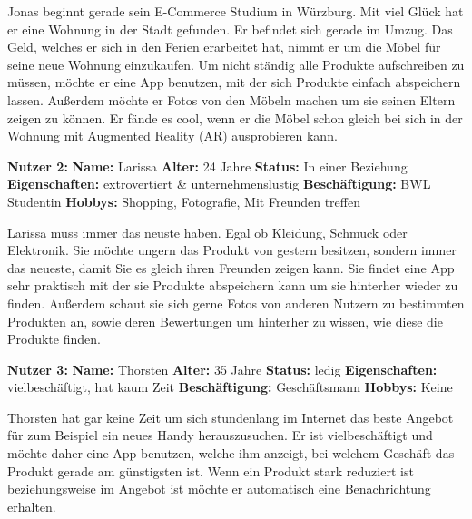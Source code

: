\documentclass{scrartcl}
\begin{document}
\noindent Jonas beginnt gerade sein E-Commerce Studium in Würzburg. Mit viel Glück hat er eine Wohnung in der Stadt gefunden. Er befindet sich gerade im Umzug. Das Geld, welches er sich in den Ferien erarbeitet hat, nimmt er um die Möbel für seine neue Wohnung einzukaufen. Um nicht ständig alle Produkte aufschreiben zu müssen, möchte er eine App benutzen, mit der sich Produkte einfach abspeichern lassen. Außerdem möchte er Fotos von den Möbeln machen um sie seinen Eltern zeigen zu können. Er fände es cool, wenn er die Möbel schon gleich bei sich in der Wohnung mit Augmented Reality (AR) ausprobieren kann. \newline 

\noindent \textbf{Nutzer 2: \newline}
\textbf{Name:} Larissa \newline
\textbf{Alter:} 24 Jahre \newline 
\textbf{Status:} In einer Beziehung \newline 
\textbf{Eigenschaften:} extrovertiert \& unternehmenslustig \newline
\textbf{Beschäftigung:} BWL Studentin \newline
\textbf{Hobbys:} Shopping, Fotografie, Mit Freunden treffen \newline

\noindent Larissa muss immer das neuste haben. Egal ob Kleidung, Schmuck oder Elektronik. Sie möchte ungern das Produkt von gestern besitzen, sondern immer das neueste, damit Sie es gleich ihren Freunden zeigen kann. Sie findet eine App sehr praktisch mit der sie Produkte abspeichern kann um sie hinterher wieder zu finden. Außerdem schaut sie sich gerne Fotos von anderen Nutzern zu bestimmten Produkten an, sowie deren Bewertungen um hinterher zu wissen, wie diese die Produkte finden. \newline 

\noindent \textbf{Nutzer 3: \newline}
\textbf{Name:} Thorsten \newline
\textbf{Alter:} 35 Jahre \newline 
\textbf{Status:} ledig \newline 
\textbf{Eigenschaften:} vielbeschäftigt, hat kaum Zeit \newline
\textbf{Beschäftigung:} Geschäftsmann \newline
\textbf{Hobbys:} Keine \newline

\noindent Thorsten hat gar keine Zeit um sich stundenlang im Internet das beste Angebot für zum Beispiel ein neues Handy herauszusuchen. Er ist vielbeschäftigt und möchte daher eine App benutzen, welche ihm anzeigt, bei welchem Geschäft das Produkt gerade am günstigsten ist. Wenn ein Produkt stark reduziert ist beziehungsweise im Angebot ist möchte er automatisch eine Benachrichtung erhalten.
\end{document}
